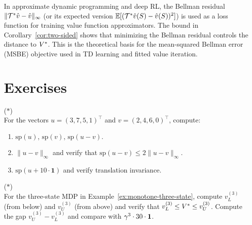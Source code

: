 \documentclass[11pt,a4paper]{article}
\begin{document}
\begin{rlconnection}[title={Bellman Error in Approximate DP}]
In approximate dynamic programming and deep RL, the Bellman residual
$\|\mathcal{T}^* \hat{v} - \hat{v}\|_\infty$ (or its expected version
$\mathbb{E}[(\mathcal{T}^* \hat{v}(S) - \hat{v}(S))^2]$) is used as a loss
function for training value function approximators. The bound in
Corollary~\ref{cor:two-sided} shows that minimizing the Bellman
residual controls the distance to $V^*$. This is the theoretical
basis for the mean-squared Bellman error (MSBE) objective used in
TD learning and fitted value iteration.
\end{rlconnection}


\section{Exercises}
\label{sec:exercises}

\begin{exercise} \textnormal{(\(*\))} \\
For the vectors $u = (3, 7, 5, 1)^\top$ and
$v = (2, 4, 6, 0)^\top$, compute:
\begin{enumerate}[label=(\alph*)]
    \item $\mathrm{sp}(u)$, $\mathrm{sp}(v)$,
    $\mathrm{sp}(u - v)$.
    \item $\|u - v\|_\infty$ and verify that
    $\mathrm{sp}(u - v) \leq 2\|u - v\|_\infty$.
    \item $\mathrm{sp}(u + 10 \cdot \mathbf{1})$ and verify
    translation invariance.
\end{enumerate}
\end{exercise}

\begin{exercise}
\textnormal{(\(*\))} \\
For the three-state MDP in Example~\ref{ex:monotone-three-state},
compute $v^{(3)}_L$ (from below) and $v^{(3)}_U$ (from above) and
verify that $v^{(3)}_L \leq V^* \leq v^{(3)}_U$. Compute the
gap $v^{(3)}_U - v^{(3)}_L$ and compare with
$\gamma^3 \cdot 30 \cdot \mathbf{1}$.
\end{exercise}
\end{document}
